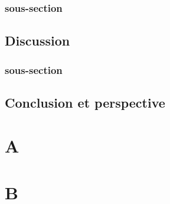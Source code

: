 \documentclass[10pt,a4paper,openright]{report}
\begin{document}
\subsection{sous-section}
\newpage
\section{Discussion}
\subsection{sous-section}
\newpage
	\section*{Conclusion et perspective}
	\newpage
	
\listoffigures
	
\appendix
\chapter{A}
\chapter{B}
\end{document}
